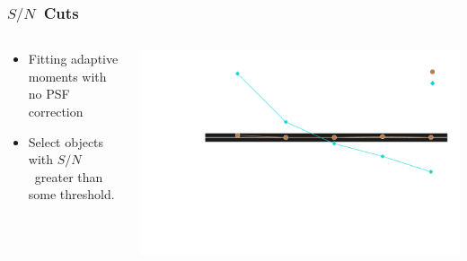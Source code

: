 \documentclass{beamer}
\newcommand{\snr}{$S/N$}
\begin{document}
\frame
{
    \frametitle{\snr\ Cuts}
 

    \begin{columns}
        \begin{column}{0.4\textwidth}
            \begin{itemize}
                \item Fitting adaptive moments with no PSF correction
                \item Select objects with \snr\ greater than some threshold.
            \end{itemize}
        \end{column}
        \begin{column}{0.6\textwidth}
            \begin{center}
            \includegraphics[width=\textwidth]{mc-select-bias-thresh-with-nocorr-inv.pdf}
                \newline
            \end{center}
        \end{column}
    \end{columns}


}
\end{document}

